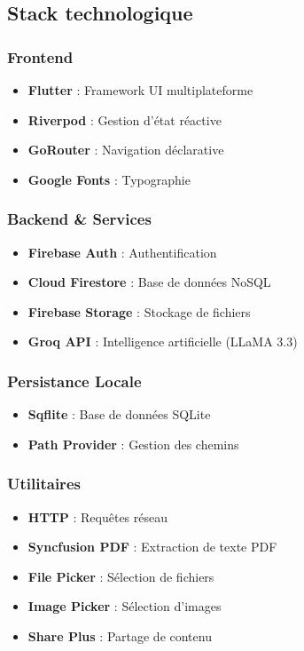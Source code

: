 \documentclass[12pt,a4paper]{report}
\begin{document}
\subsection{Stack technologique}

\subsubsection{Frontend}
\begin{itemize}
    \item \textbf{Flutter} : Framework UI multiplateforme
    \item \textbf{Riverpod} : Gestion d'état réactive
    \item \textbf{GoRouter} : Navigation déclarative
    \item \textbf{Google Fonts} : Typographie
\end{itemize}

\subsubsection{Backend \& Services}
\begin{itemize}
    \item \textbf{Firebase Auth} : Authentification
    \item \textbf{Cloud Firestore} : Base de données NoSQL
    \item \textbf{Firebase Storage} : Stockage de fichiers
    \item \textbf{Groq API} : Intelligence artificielle (LLaMA 3.3)
\end{itemize}

\subsubsection{Persistance Locale}
\begin{itemize}
    \item \textbf{Sqflite} : Base de données SQLite
    \item \textbf{Path Provider} : Gestion des chemins
\end{itemize}

\subsubsection{Utilitaires}
\begin{itemize}
    \item \textbf{HTTP} : Requêtes réseau
    \item \textbf{Syncfusion PDF} : Extraction de texte PDF
    \item \textbf{File Picker} : Sélection de fichiers
    \item \textbf{Image Picker} : Sélection d'images
    \item \textbf{Share Plus} : Partage de contenu
\end{itemize}
\end{document}
